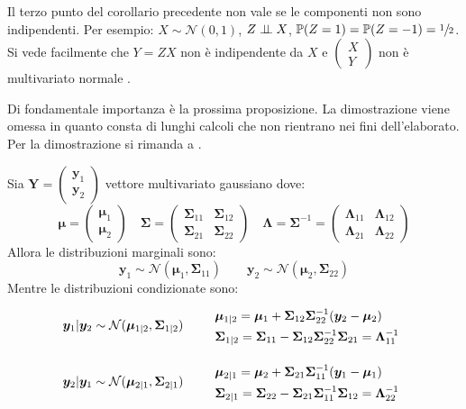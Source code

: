 \begin{oss}
Il terzo punto del corollario precedente non vale se le componenti non sono indipendenti. Per esempio: $X\sim \mathcal{N}(0,1)$, $Z\perp \!\!\! \perp X$,  $\mathbb{P}(Z=1)=\mathbb{P}(Z=-1)=\sfrac{1}{2}$. Si vede facilmente che $Y=ZX$ non è indipendente da $X$ e $\begin{pmatrix}
X\\
Y
\end{pmatrix}$ non è multivariato normale .
\end{oss}

\newpage


Di fondamentale importanza è la prossima proposizione. La dimostrazione viene omessa in quanto consta di lunghi calcoli che non rientrano nei fini dell'elaborato. Per la dimostrazione si rimanda a \cite{murphy_probabilistic_2022}.
\begin{prop} \label{marginale-condizionata}
Sia $\bm{Y}=\begin{pmatrix}\bm{y}_1 \\ \bm{y}_2\end{pmatrix}$ vettore multivariato gaussiano dove:
\[
\bm{\mu}=\begin{pmatrix}\bm{\mu}_1\\ \bm{\mu}_2\end{pmatrix}\quad
 \bm{\Sigma}=\begin{pmatrix}\bm{\Sigma}_{11}&\bm{\Sigma}_{12}\\ \bm{\Sigma}_{21}&\bm{\Sigma}_{22}\end{pmatrix}\quad \bm{\Lambda}=\bm{\Sigma}^{-1}=\begin{pmatrix}\bm{\Lambda}_{11}&\bm{\Lambda}_{12}\\\bm{\Lambda}_{21}&\bm{\Lambda}_{22}\end{pmatrix}
\]
Allora le distribuzioni marginali sono:
\[
\bm{y}_1\sim \mathcal{N}(\bm{\mu}_1, \bm{\Sigma}_{11}) \qquad \bm{y}_2\sim \mathcal{N}(\bm{\mu}_2, \bm{\Sigma}_{22})
\]
Mentre le distribuzioni condizionate sono:
\[
\bm{y}_1 | \bm{y}_2 \sim \mathcal{N}(\bm{\mu}_{1|2}, \bm{\Sigma}_{1|2}) \qquad
\def\arraystretch{1.4}
\begin{array}{l}
    \bm{\mu}_{1|2}        =\bm{\mu}_1+\bm{\Sigma}_{12}\bm{\Sigma}_{22}^{-1}(\bm{y}_2-\bm{\mu}_2)\\
    \bm{\Sigma}_{1|2}=\bm{\Sigma}_{11}-\bm{\Sigma}_{12}\bm{\Sigma}_{22}^{-1}\bm{\Sigma}_{21}=\bm{\Lambda}_{11}^{-1}
\end{array}
\]

\[
\bm{y}_2 | \bm{y}_1 \sim \mathcal{N}(\bm{\mu}_{2|1}, \bm{\Sigma}_{2|1})
\qquad
\def\arraystretch{1.4}
\begin{array}{l}
    \bm{\mu}_{2|1}        =\bm{\mu}_2+\bm{\Sigma}_{21}\bm{\Sigma}_{11}^{-1}(\bm{y}_1-\bm{\mu}_1)\\
    \bm{\Sigma}_{2|1}=\bm{\Sigma}_{22}-\bm{\Sigma}_{21}\bm{\Sigma}_{11}^{-1}\bm{\Sigma}_{12}=\bm{\Lambda}_{22}^{-1}
\end{array}
\]
\end{prop}

